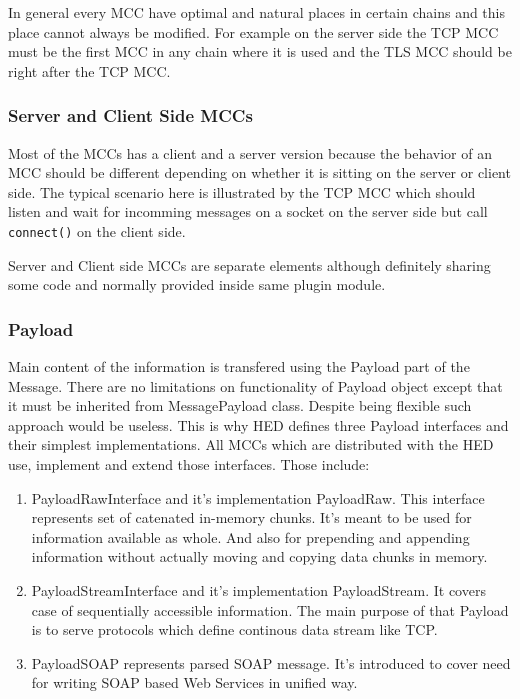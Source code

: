 \documentclass{book}
\begin{document}
In general every MCC have optimal and natural places in certain chains and this place cannot always be modified. For example on the server side the TCP MCC must be the first MCC in any chain where it is used and the TLS MCC should be right after the TCP MCC.


\subsubsection{Server and Client Side MCCs}

Most of the MCCs has a client and a server version because the behavior of an MCC should be different depending on whether it is sitting on the server or client side. The typical scenario here is illustrated by the TCP MCC which should listen and wait for incomming messages on a socket on the server side but call \texttt{connect()} on the client side.

Server and Client side MCCs are separate elements although definitely sharing some code and normally provided inside same plugin module.


\subsubsection{Payload}

Main content of the information is transfered using the Payload part of the Message. There are no limitations on functionality of Payload object except that it must be inherited from MessagePayload class. Despite being flexible such approach would be useless. This is why HED defines three Payload interfaces and their simplest implementations. All MCCs which are distributed with the HED use, implement and extend those interfaces. Those include:

\begin{enumerate}

\item PayloadRawInterface and it's implementation PayloadRaw. This interface represents set of catenated in-memory chunks. It's meant to be used for information available as whole. And also for prepending and appending information without actually moving and copying data chunks in memory.

\item PayloadStreamInterface and it's implementation PayloadStream. It covers case of sequentially accessible information. The main purpose of that Payload is to serve protocols which define continous data stream like TCP.

\item PayloadSOAP represents parsed SOAP message. It's introduced to cover need for writing SOAP based Web Services in unified way.

\end{enumerate}
\end{document}
